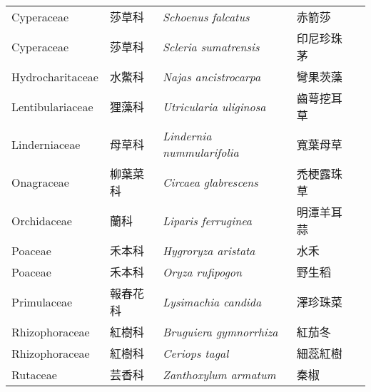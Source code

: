 {\begin{longtable}{p{2.5cm}p{2cm}p{5cm}p{2.5cm}p{3cm}}
    Cyperaceae & 莎草科 & \textit{Schoenus falcatus}  \index{Schoenus@\textit{Schoenus}!falcatus@\textit{falcatus}}           & 赤箭莎 \index{赤箭莎} &  \\
    Cyperaceae & 莎草科 & \textit{Scleria sumatrensis}  \index{Scleria@\textit{Scleria}!sumatrensis@\textit{sumatrensis}}         & 印尼珍珠茅 \index{印尼珍珠茅} &  \\
    Hydrocharitaceae & 水鱉科 & \textit{Najas ancistrocarpa}  \index{Najas@\textit{Najas}!ancistrocarpa@\textit{ancistrocarpa}}   & 彎果茨藻 \index{彎果茨藻} &  \\
    Lentibulariaceae & 狸藻科 & \textit{Utricularia uliginosa}  \index{Utricularia@\textit{Utricularia}!uliginosa@\textit{uliginosa}} & 齒萼挖耳草 \index{齒萼挖耳草} &  \\
    Linderniaceae & 母草科 & \textit{Lindernia nummularifolia}  \index{Lindernia@\textit{Lindernia}!nummularifolia@\textit{nummularifolia}} & 寬葉母草 \index{寬葉母草} &  \\
    Onagraceae & 柳葉菜科 & \textit{Circaea glabrescens}  \index{Circaea@\textit{Circaea}!glabrescens@\textit{glabrescens}}       & 禿梗露珠草 \index{禿梗露珠草} &  \\
    Orchidaceae & 蘭科 & \textit{Liparis ferruginea}  \index{Liparis@\textit{Liparis}!ferruginea@\textit{ferruginea}}           & 明潭羊耳蒜 \index{明潭羊耳蒜} &  \\
    Poaceae & 禾本科 & \textit{Hygroryza aristata}  \index{Hygroryza@\textit{Hygroryza}!aristata@\textit{aristata}}             & 水禾 \index{水禾} &  \\
    Poaceae & 禾本科 & \textit{Oryza rufipogon}  \index{Oryza@\textit{Oryza}!rufipogon@\textit{rufipogon}}                & 野生稻 \index{野生稻} &  \\
    Primulaceae & 報春花科 & \textit{Lysimachia candida}  \index{Lysimachia@\textit{Lysimachia}!candida@\textit{candida}}       & 澤珍珠菜 \index{澤珍珠菜} &  \\
    Rhizophoraceae & 紅樹科 & \textit{Bruguiera gymnorrhiza}  \index{Bruguiera@\textit{Bruguiera}!gymnorrhiza@\textit{gymnorrhiza}}   & 紅茄冬 \index{紅茄冬} &  \\
    Rhizophoraceae & 紅樹科 & \textit{Ceriops tagal}  \index{Ceriops@\textit{Ceriops}!tagal@\textit{tagal}}           & 細蕊紅樹 \index{細蕊紅樹} &  \\
    Rutaceae & 芸香科 & \textit{Zanthoxylum armatum}  \index{Zanthoxylum@\textit{Zanthoxylum}!armatum@\textit{armatum}}           & 秦椒 \index{秦椒} &  \\
    \bottomrule
    \end{longtable}
}